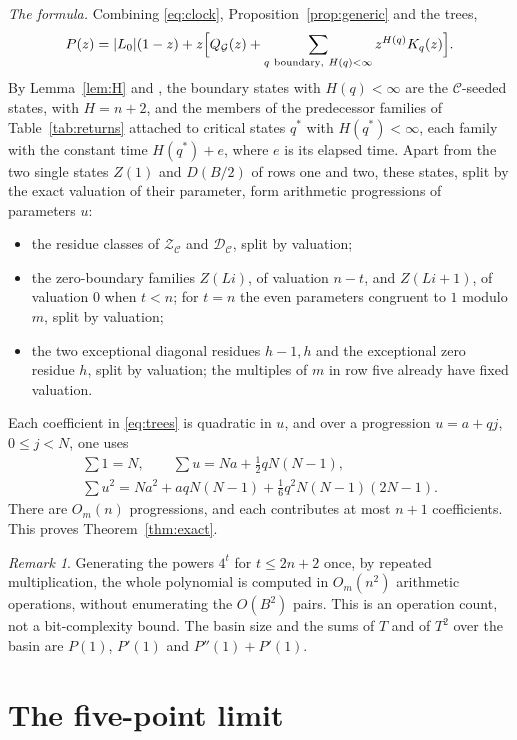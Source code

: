\documentclass[11pt]{amsart}
\theoremstyle{remark}
\newtheorem*{remark}{Remark}
\newcommand{\C}{\mathcal{C}}
\newcommand{\G}{\mathcal{G}}
\newcommand{\Zs}{\mathcal{Z}}
\newcommand{\Ds}{\mathcal{D}}
\begin{document}
\emph{The formula.} Combining \eqref{eq:clock}, Proposition~\ref{prop:generic} and the trees,
\begin{equation}\label{eq:P}
P(z)=|L_0|(1-z)+z\Bigl[Q_\G(z)+\sum_{q\ \text{boundary},\ H(q)<\infty}z^{H(q)}K_q(z)\Bigr].
\end{equation}
By Lemma~\ref{lem:H} and \cite[Proposition~7]{G1}, the boundary states with $H(q)<\infty$ are the $\C$-seeded states, with $H=n+2$, and the members of the predecessor families of Table~\ref{tab:returns} attached to critical states $q^*$ with $H(q^*)<\infty$, each family with the constant time $H(q^*)+e$, where $e$ is its elapsed time. Apart from the two single states $Z(1)$ and $D(B/2)$ of rows one and two, these states, split by the exact valuation of their parameter, form arithmetic progressions of parameters $u$:
\begin{itemize}
\item the residue classes of $\Zs_\C$ and $\Ds_\C$, split by valuation;
\item the zero-boundary families $Z(Li)$, of valuation $n-t$, and $Z(Li+1)$, of valuation $0$ when $t<n$; for $t=n$ the even parameters congruent to $1$ modulo $m$, split by valuation;
\item the two exceptional diagonal residues $h-1,h$ and the exceptional zero residue $h$, split by valuation; the multiples of $m$ in row five already have fixed valuation.
\end{itemize}
Each coefficient in \eqref{eq:trees} is quadratic in $u$, and over a progression $u=a+qj$, $0\le j<N$, one uses
\begin{gather*}
\sum1=N,\qquad\sum u=Na+\tfrac12qN(N-1),\\
\sum u^2=Na^2+aqN(N-1)+\tfrac16q^2N(N-1)(2N-1).
\end{gather*}
There are $O_m(n)$ progressions, and each contributes at most $n+1$ coefficients. This proves Theorem~\ref{thm:exact}.

\begin{remark}
Generating the powers $4^t$ for $t\le2n+2$ once, by repeated multiplication, the whole polynomial is computed in $O_m(n^2)$ arithmetic operations, without enumerating the $O(B^2)$ pairs. This is an operation count, not a bit-complexity bound. The basin size and the sums of $T$ and of $T^2$ over the basin are $P(1)$, $P'(1)$ and $P''(1)+P'(1)$.
\end{remark}

\section{The five-point limit}\label{sec:limit}
\end{document}
